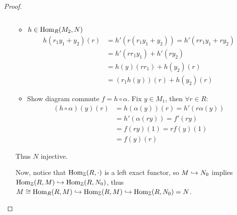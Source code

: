 \begin{theorem}
\begin{proof}
\begin{enumerate}[label={\bf Case \arabic*:}]
\begin{itemize}
\[            \]
          \item $h \in \operatorname{Hom}_R(M_2, N)$
            \[
              \begin{aligned}
                h(r_1y_1 + y_2)(r) &= h'(r(r_1y_1 + y_2))
                = h'(rr_1y_1 + ry_2) \\
                &= h'(rr_1y_1) + h'(ry_2) \\
                &= h(y)(rr_1) + h(y_2)(r) \\
                &= (r_1h(y))(r) + h(y_2)(r)
              \end{aligned}
            \]
          \item Show diagram commute $f = h \circ \alpha$.
            Fix $y \in M_1$, then $\forall r \in R$:
            \[
              \begin{aligned}
                (h \circ \alpha)(y)(r) &= h(\alpha(y))(r)  = h'(r\alpha(y))\\
                                      &= h'(\alpha(ry)) = f'(ry) \\
                                      &= f(ry)(1) = rf(y)(1) \\
                                      &= f(y)(r)
              \end{aligned}
            \]
        \end{itemize}
        Thus $N$ injective.

        Now, notice that $\operatorname{Hom}_{\mathbb{Z}}(R, \cdot)$ is a left exact functor,
        so $M \hookrightarrow N_0$ implies $\operatorname{Hom}_{\mathbb{Z}}(R, M) \hookrightarrow \operatorname{Hom}_{\mathbb{Z}}(R, N_0)$,
        thus $M \cong \operatorname{Hom}_R(R, M) \hookrightarrow \operatorname{Hom}_{\mathbb{Z}}(R, M) \hookrightarrow 
        \operatorname{Hom}_{\mathbb{Z}}(R,N_0) = N$.
        \qedhere
    \end{enumerate}
 \end{proof}
\end{theorem}

